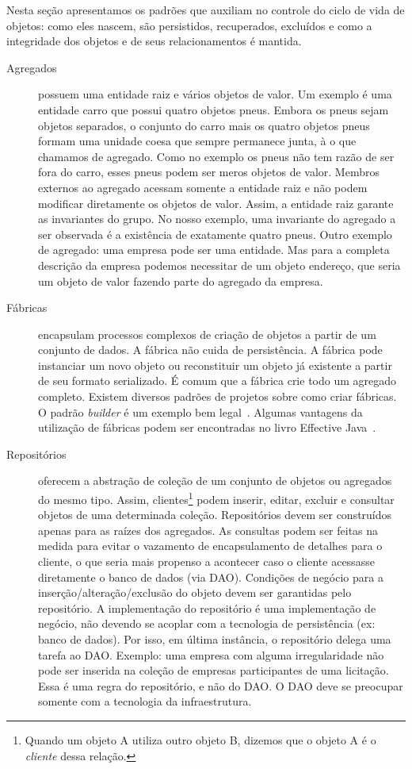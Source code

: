 \documentclass[a4paper, 12pt]{article}
\begin{document}
Nesta seção apresentamos os padrões que auxiliam no controle do ciclo de vida de objetos: como eles nascem, são persistidos, recuperados, excluídos e como a integridade dos objetos e de seus relacionamentos é mantida.


\begin{description}

\item [Agregados] possuem uma entidade raiz e vários objetos de valor. Um exemplo é uma entidade carro que possui quatro objetos pneus. Embora os pneus sejam objetos separados, o conjunto do carro mais os quatro objetos pneus formam uma unidade coesa que sempre permanece junta, à o que chamamos de agregado. Como no exemplo os pneus não tem razão de ser fora do carro, esses pneus podem ser meros objetos de valor. Membros externos ao agregado acessam somente a entidade raiz e não podem modificar diretamente os objetos de valor. Assim, a entidade raiz garante as invariantes do grupo. No nosso exemplo, uma invariante do agregado a ser observada é a existência de exatamente quatro pneus. Outro exemplo de agregado: uma empresa pode ser uma entidade. Mas para a completa descrição da empresa podemos necessitar de um objeto endereço, que seria um objeto de valor fazendo parte do agregado da empresa.

\item [Fábricas] encapsulam processos complexos de criação de objetos a partir de um conjunto de dados. A fábrica não cuida de persistência. A fábrica pode instanciar um novo objeto ou reconstituir um objeto já existente a partir de seu formato serializado. É comum que a fábrica crie todo um agregado completo.
Existem diversos padrões de projetos sobre como criar fábricas. O padrão \emph{builder} é um exemplo bem legal~\cite{Bloch2008Builder}. Algumas vantagens da utilização de fábricas podem ser encontradas no livro Effective Java~\cite{Bloch2008Factory}. 

\item [Repositórios] oferecem a abstração de coleção de um conjunto de objetos ou agregados do mesmo tipo. Assim, clientes\footnote{Quando um objeto A utiliza outro objeto B, dizemos que o objeto A é o \emph{cliente} dessa relação.} podem inserir, editar, excluir e consultar objetos de uma determinada coleção. Repositórios devem ser construídos apenas para as raízes dos agregados. As consultas podem ser feitas na medida para evitar o vazamento de encapsulamento de detalhes para o cliente, o que seria mais propenso a acontecer caso o cliente acessasse diretamente o banco de dados (via DAO). Condições de negócio para a inserção/alteração/exclusão do objeto devem ser garantidas pelo repositório. A implementação do repositório é uma implementação de negócio, não devendo se acoplar com a tecnologia de persistência (ex: banco de dados). Por isso, em última instância, o repositório delega uma tarefa ao DAO. Exemplo: uma empresa com alguma irregularidade não pode ser inserida na coleção de empresas participantes de uma licitação. Essa é uma regra do repositório, e não do DAO. O DAO deve se preocupar somente com a tecnologia da infraestrutura.

\end{description}
\end{document}
